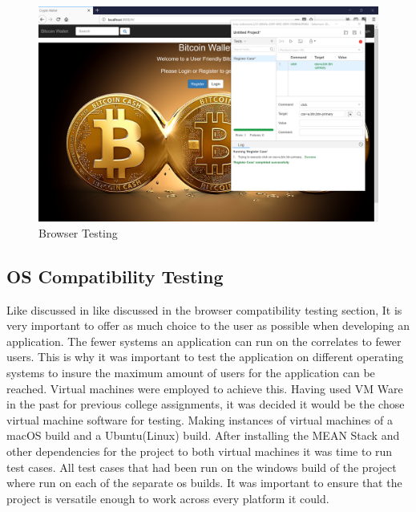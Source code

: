 \begin{figure}[H]
\centering
\includegraphics[scale=0.44]{img/selenium.png}
\caption{Browser Testing}
\end{figure}

\subsection{OS Compatibility Testing}
Like discussed in like discussed in the browser compatibility testing section, It is very important to offer as much choice to the user as possible when developing an application. The fewer systems an application can run on the correlates to fewer users. This is why it was important to test the application on different operating systems to insure the maximum amount of users for the application can be reached. Virtual machines were employed to achieve this. Having used VM Ware in the past for previous college assignments, it was decided it would be the chose virtual machine software for testing. Making instances of virtual machines of a macOS build and a Ubuntu(Linux) build. After installing the MEAN Stack and other dependencies for the project to both virtual machines it was time to run test cases. All test cases that had been run on the windows build of the project where run on each of the separate os builds. It was important to ensure that the project is versatile enough to work across every platform it could.

